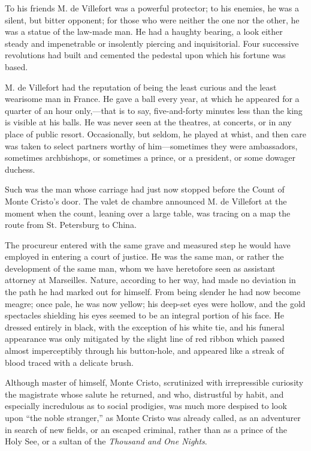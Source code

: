 To his friends M. de Villefort was a powerful protector; to his
enemies, he was a silent, but bitter opponent; for those who were
neither the one nor the other, he was a statue of the law-made man. He
had a haughty bearing, a look either steady and impenetrable or
insolently piercing and inquisitorial. Four successive revolutions had
built and cemented the pedestal upon which his fortune was based.

M. de Villefort had the reputation of being the least curious and the
least wearisome man in France. He gave a ball every year, at which he
appeared for a quarter of an hour only,—that is to say, five-and-forty
minutes less than the king is visible at his balls. He was never seen
at the theatres, at concerts, or in any place of public resort.
Occasionally, but seldom, he played at whist, and then care was taken
to select partners worthy of him—sometimes they were ambassadors,
sometimes archbishops, or sometimes a prince, or a president, or some
dowager duchess.

Such was the man whose carriage had just now stopped before the Count
of Monte Cristo’s door. The valet de chambre announced M. de Villefort
at the moment when the count, leaning over a large table, was tracing
on a map the route from St. Petersburg to China.

The procureur entered with the same grave and measured step he would
have employed in entering a court of justice. He was the same man, or
rather the development of the same man, whom we have heretofore seen as
assistant attorney at Marseilles. Nature, according to her way, had
made no deviation in the path he had marked out for himself. From being
slender he had now become meagre; once pale, he was now yellow; his
deep-set eyes were hollow, and the gold spectacles shielding his eyes
seemed to be an integral portion of his face. He dressed entirely in
black, with the exception of his white tie, and his funeral appearance
was only mitigated by the slight line of red ribbon which passed almost
imperceptibly through his button-hole, and appeared like a streak of
blood traced with a delicate brush.

Although master of himself, Monte Cristo, scrutinized with
irrepressible curiosity the magistrate whose salute he returned, and
who, distrustful by habit, and especially incredulous as to social
prodigies, was much more despised to look upon “the noble stranger,” as
Monte Cristo was already called, as an adventurer in search of new
fields, or an escaped criminal, rather than as a prince of the Holy
See, or a sultan of the \textit{Thousand and One Nights}.


